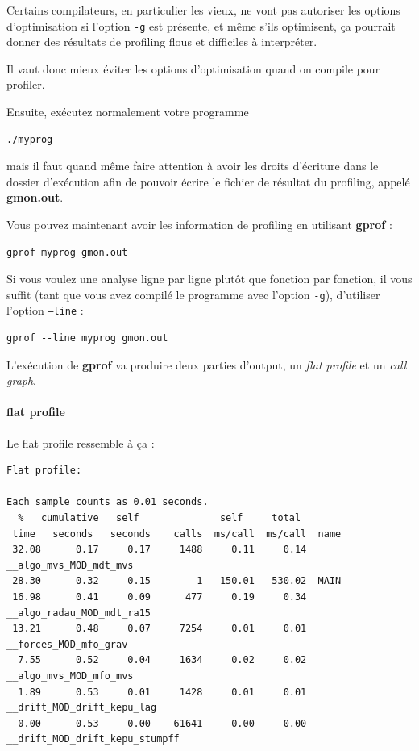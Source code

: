 \documentclass[a4paper,twoside]{article}
\begin{document}
\begin{remarque}
Certains compilateurs, en particulier les vieux, ne vont pas autoriser les options d'optimisation si l'option \texttt{-g} est présente, et même s'ils optimisent, ça pourrait donner des résultats de profiling flous et difficiles à interpréter. 

Il vaut donc mieux éviter les options d'optimisation quand on compile pour profiler. 
\end{remarque}

Ensuite, exécutez normalement votre programme
\begin{verbatim}
./myprog
\end{verbatim}
mais il faut quand même faire attention à avoir les droits d'écriture dans le dossier d'exécution afin de pouvoir écrire le fichier de résultat du profiling, appelé \textbf{gmon.out}. 

\bigskip

Vous pouvez maintenant avoir les information de profiling en utilisant \textbf{gprof} :
\begin{verbatim}
gprof myprog gmon.out
\end{verbatim}

\begin{remarque}
Si vous voulez une analyse ligne par ligne plutôt que fonction par fonction, il vous suffit (tant que vous avez compilé le programme avec l'option \texttt{-g}), d'utiliser l'option \texttt{--line} :
\begin{verbatim}
gprof --line myprog gmon.out
\end{verbatim}
\end{remarque}

L'exécution de \textbf{gprof} va produire deux parties d'output, un \textit{flat profile} et un \textit{call graph}.
\paragraph{flat profile}
Le flat profile ressemble à ça : 
\begin{verbatim}
Flat profile:

Each sample counts as 0.01 seconds.
  %   cumulative   self              self     total           
 time   seconds   seconds    calls  ms/call  ms/call  name    
 32.08      0.17     0.17     1488     0.11     0.14  __algo_mvs_MOD_mdt_mvs
 28.30      0.32     0.15        1   150.01   530.02  MAIN__
 16.98      0.41     0.09      477     0.19     0.34  __algo_radau_MOD_mdt_ra15
 13.21      0.48     0.07     7254     0.01     0.01  __forces_MOD_mfo_grav
  7.55      0.52     0.04     1634     0.02     0.02  __algo_mvs_MOD_mfo_mvs
  1.89      0.53     0.01     1428     0.01     0.01  __drift_MOD_drift_kepu_lag
  0.00      0.53     0.00    61641     0.00     0.00  __drift_MOD_drift_kepu_stumpff
\end{verbatim}
\end{document}
